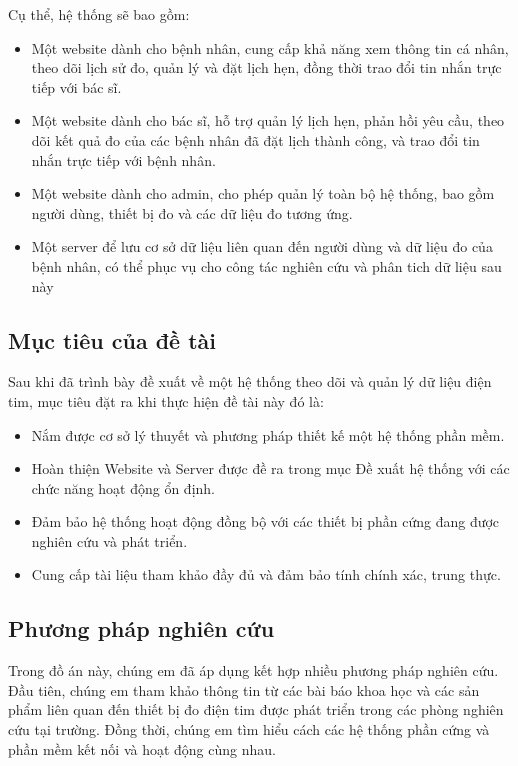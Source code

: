 Cụ thể, hệ thống sẽ bao gồm:

\begin{adjustwidth}{1.5em}{}
  \begin{itemize}
     
      \item Một website dành cho bệnh nhân, cung cấp khả năng xem thông tin cá nhân, theo dõi lịch sử đo, quản lý và đặt lịch hẹn, đồng thời trao đổi tin nhắn trực tiếp với bác sĩ.
      \item Một website dành cho bác sĩ, hỗ trợ quản lý lịch hẹn, phản hồi yêu cầu, theo dõi kết quả đo của các bệnh nhân đã đặt lịch thành công, và trao đổi tin nhắn trực tiếp với bệnh nhân.
      \item Một website dành cho admin, cho phép quản lý toàn bộ hệ thống, bao gồm người dùng, thiết bị đo và các dữ liệu đo tương ứng.
      \item Một server để lưu cơ sở dữ liệu liên quan đến người dùng và dữ liệu đo của bệnh nhân, có thể phục vụ cho công tác nghiên cứu và phân tich dữ liệu sau này

  \end{itemize}
  \end{adjustwidth}


\subsection*{Mục tiêu của đề tài}
Sau khi đã trình bày đề xuất về một hệ thống theo dõi và quản lý dữ liệu điện tim, mục tiêu đặt ra khi thực hiện
đề tài này đó là:

\begin{adjustwidth}{1.5em}{}
  \begin{itemize}
      \item Nắm được cơ sở lý thuyết và phương pháp thiết kế một hệ thống phần mềm.
      \item Hoàn thiện Website và Server được đề ra trong mục Đề xuất hệ thống với các chức năng hoạt động ổn định.
      \item Đảm bảo hệ thống hoạt động đồng bộ với các thiết bị phần cứng đang được nghiên cứu và phát triển.
      \item Cung cấp tài liệu tham khảo đầy đủ và đảm bảo tính chính xác, trung thực.

  \end{itemize}
  \end{adjustwidth}

\subsection*{Phương pháp nghiên cứu}
Trong đồ án này, chúng em đã áp dụng kết hợp nhiều phương pháp nghiên cứu. Đầu tiên, chúng em tham khảo thông tin từ các bài báo khoa học và các sản phẩm liên quan đến thiết bị đo điện tim được phát triển trong các phòng nghiên cứu tại trường.
Đồng thời, chúng em tìm hiểu cách các hệ thống phần cứng và phần mềm kết nối và hoạt động cùng nhau. 

